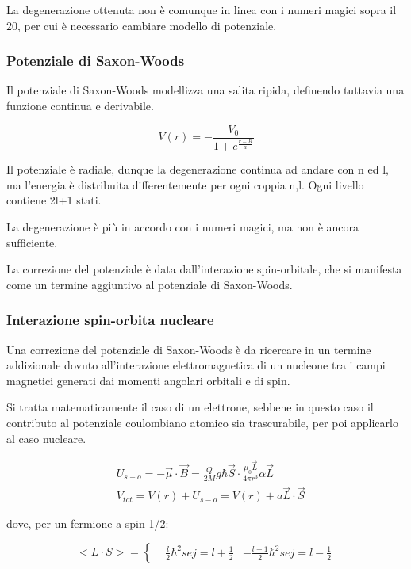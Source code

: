 \documentclass{article}
\begin{document}
La degenerazione ottenuta non è comunque in linea con i numeri magici sopra il 20, per cui è necessario cambiare modello di potenziale.

\subsubsection{Potenziale di Saxon-Woods}

Il potenziale di Saxon-Woods modellizza una salita ripida, definendo tuttavia una funzione continua e derivabile.

\begin{equation}
    V(r)=-\frac{V_0}{1+e^{\frac{r-R}{a}}}
\end{equation}

Il potenziale è radiale, dunque la degenerazione continua ad andare con n ed l, ma l'energia è distribuita differentemente per ogni coppia n,l.
Ogni livello contiene 2l+1 stati.

La degenerazione è più in accordo con i numeri magici, ma non è ancora sufficiente.

La correzione del potenziale è data dall'interazione spin-orbitale, che si manifesta come un termine aggiuntivo al potenziale di Saxon-Woods.

\subsubsection{Interazione spin-orbita nucleare}
Una correzione del potenziale di Saxon-Woods è da ricercare in un termine addizionale dovuto all'interazione elettromagnetica di un nucleone tra i campi magnetici generati dai momenti angolari orbitali e di spin.

Si tratta matematicamente il caso di un elettrone, sebbene in questo caso il contributo al potenziale coulombiano atomico sia trascurabile, per poi applicarlo al caso nucleare.

\begin{equation}
    \begin{aligned}
         & U_{s-o}=-\vec{\mu}\cdot \vec{B}= \frac{Q}{2M}g\hbar\vec{S}\cdot \frac{\mu_0\vec{L}}{4\pi r^3}\alpha \vec{L} \\
         & V_{tot}= V(r)+U_{s-o}=V(r)+a\vec{L}\cdot \vec{S}
    \end{aligned}
\end{equation}

dove, per un fermione a spin 1/2:

\begin{equation}
    <L\cdot S>=
    \left\{
    \begin{aligned}
         & \frac{l}{2}\hbar^2 se j=l+\frac{1}{2}
         & -\frac{l+1}{2}\hbar^2 se j=l-\frac{1}{2}
    \end{aligned}
    \right.
\end{equation}
\end{document}
